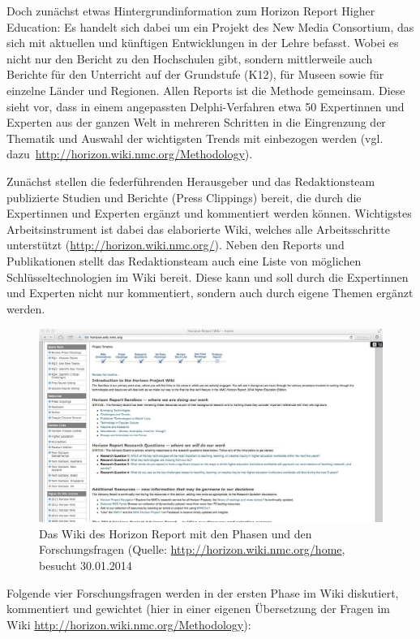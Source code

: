 \documentclass[a4paper,
fontsize=11pt,
oneside,
numbers=noperiodatend,
parskip=half-,
bibliography=totoc,
final
]{scrartcl}
\begin{document}
Doch zunächst etwas Hintergrundinformation zum Horizon Report Higher
Education: Es handelt sich dabei um ein Projekt des New Media
Consortium, das sich mit aktuellen und künftigen Entwicklungen in der
Lehre befasst. Wobei es nicht nur den Bericht zu den Hochschulen gibt,
sondern mittlerweile auch Berichte für den Unterricht auf der Grundstufe
(K12), für Museen sowie für einzelne Länder und Regionen. Allen Reports
ist die Methode gemeinsam. Diese sieht vor, dass in einem angepassten
Delphi-Verfahren etwa 50 Expertinnen und Experten aus der ganzen Welt in
mehreren Schritten in die Eingrenzung der Thematik und Auswahl der
wichtigsten Trends mit einbezogen werden (vgl.
dazu~\url{http://horizon.wiki.nmc.org/Methodology}).

Zunächst stellen die federführenden Herausgeber und das Redaktionsteam
publizierte Studien und Berichte (Press Clippings) bereit, die durch die
Expertinnen und Experten ergänzt und kommentiert werden können.
Wichtigstes Arbeitsinstrument ist dabei das elaborierte Wiki, welches
alle Arbeitsschritte unterstützt
(\href{http://horizon.wiki.nmc.org}{http://horizon.wiki.nmc.org/}).
Neben den Reports und Publikationen stellt das Redaktionsteam auch eine
Liste von möglichen Schlüsseltechnologien im Wiki bereit. Diese kann und
soll durch die Expertinnen und Experten nicht nur kommentiert, sondern
auch durch eigene Themen ergänzt werden.

\begin{figure}[htbp]
\centering
\includegraphics{./img/01-Horizon_Wiki.jpg}
\caption{Das Wiki des Horizon Report mit den Phasen und den
Forschungsfragen (Quelle: \url{http://horizon.wiki.nmc.org/home},
besucht 30.01.2014}
\end{figure}

Folgende vier Forschungsfragen werden in der ersten Phase im Wiki
diskutiert, kommentiert und gewichtet (hier in einer eigenen Übersetzung
der Fragen im Wiki \url{http://horizon.wiki.nmc.org/Methodology}):~
\end{document}
